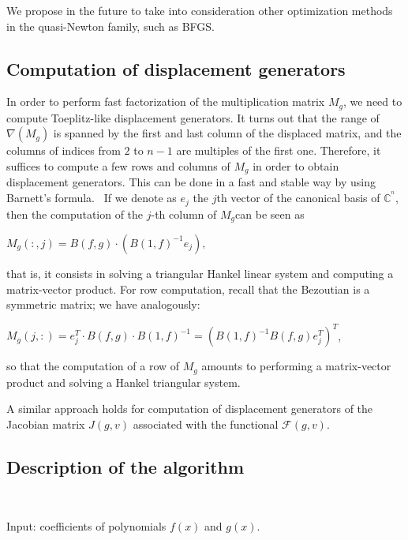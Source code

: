 \documentclass{article}
\begin{document}
We propose in the future to take into consideration other optimization methods
in the quasi-Newton family, such as BFGS.

\subsection{Computation of displacement generators}



In order to perform fast factorization of the multiplication matrix $M_g$, we
need to compute Toeplitz-like displacement generators. It turns out that the
range of $\nabla (M_g)$ is spanned by the first and last column of the
displaced matrix, and the columns of indices from $2$ to $n - 1$ are multiples
of the first one. Therefore, it suffices to compute a few rows and columns of
$M_g$ in order to obtain displacement generators. This can be done in a fast
and stable way by using Barnett's formula. \ If we denote as $e_j$ the $j$th
vector of the canonical basis of $\mathbb{C}^{^n}$, then the computation of
the $j$-th column of $M_g $can be seen as

$M_g (:, j) = B (f, g) \cdot \left( B (1, f)^{- 1} e_j \right),$

{\noindent}that is, it consists in solving a triangular Hankel linear system
and computing a matrix-vector product. For row computation, recall that the
Bezoutian is a symmetric matrix; we have analogously:

$M_g (j, :) = e_{j^{}}^T \cdot B (f, g) \cdot B (1, f)^{- 1} = \left( B (1,
f)^{- 1} B (f, g) e_j^T \right)^T$,

{\noindent}so that the computation of a row of $M_g$ amounts to performing a
matrix-vector product and solving a Hankel triangular system.

A similar approach holds for computation of displacement generators of the
Jacobian matrix $J (g, v)$ associated with the functional $\mathcal{F}(g, v)$.

\subsection{Description of the algorithm} \

Input: coefficients of polynomials $f (x)$ and $g (x)$.
\end{document}
